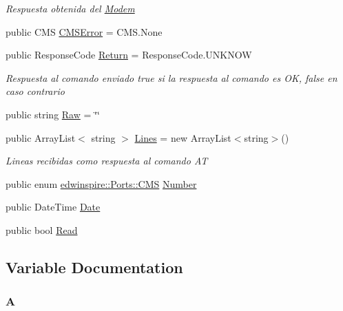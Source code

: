\begin{DoxyCompactItemize}
\begin{DoxyCompactList}\small\item\em Respuesta obtenida del \hyperlink{classedwinspire_1_1_ports_1_1_modem}{Modem} \end{DoxyCompactList}\item 
public C\-M\-S \hyperlink{namespaceedwinspire_1_1_ports_aacf05e654cc931a34f76bbcffe360339}{C\-M\-S\-Error} = C\-M\-S.\-None
\item 
public Response\-Code \hyperlink{namespaceedwinspire_1_1_ports_a8b086f30ecfbef96ca3e5f5642767975}{Return} = Response\-Code.\-U\-N\-K\-N\-O\-W
\begin{DoxyCompactList}\small\item\em Respuesta al comando enviado true si la respuesta al comando es O\-K, false en caso contrario \end{DoxyCompactList}\item 
public string \hyperlink{namespaceedwinspire_1_1_ports_afeb780627bc31cc4b50e998eaf2fb6f0}{Raw} = \char`\"{}\char`\"{}
\item 
public Array\-List$<$ string $>$ \hyperlink{namespaceedwinspire_1_1_ports_a6989ba34677ae553d4d312c9ae744532}{Lines} = new Array\-List$<$string$>$()
\begin{DoxyCompactList}\small\item\em Lineas recibidas como respuesta al comando A\-T \end{DoxyCompactList}\item 
public enum \hyperlink{namespaceedwinspire_1_1_ports_aa6e4441b65db895e600a13038b3d5ff4}{edwinspire\-::\-Ports\-::\-C\-M\-S} \hyperlink{namespaceedwinspire_1_1_ports_a22f616818dc85fd8ee4b9f3821546acb}{Number}
\item 
public Date\-Time \hyperlink{namespaceedwinspire_1_1_ports_a506e2d03085ed736361fd15035c2e456}{Date}
\item 
public bool \hyperlink{namespaceedwinspire_1_1_ports_a4bfcb5e5e2846ac1676d0f53dff50445}{Read}
\end{DoxyCompactItemize}


\subsection{Variable Documentation}
\hypertarget{libspire__modem__new_8vala_a3b98e2dffc6cb06a89dcb0d5c60a0206}{
\subsubsection[{A}]{\setlength{\rightskip}{0pt plus 5cm}A}}\label{libspire__modem__new_8vala_a3b98e2dffc6cb06a89dcb0d5c60a0206}


